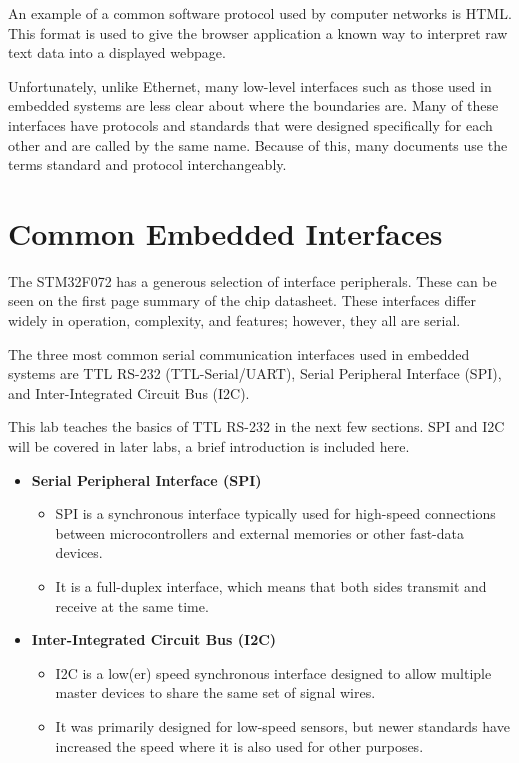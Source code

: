 \documentclass[11pt,fleqn]{book} %
\begin{document}
An example of a common software protocol used by computer networks is HTML. This format is used to give the browser application a known way to interpret raw text data into a displayed webpage. 

Unfortunately, unlike Ethernet, many low-level interfaces such as those used in embedded systems are less clear about where the boundaries are. Many of these interfaces have protocols and standards that were designed specifically for each other and are called by the same name. 
Because of this, many documents use the terms standard and protocol interchangeably. 

\section{Common Embedded Interfaces}
The STM32F072 has a generous selection of interface peripherals. These can be seen on the first page summary of the chip datasheet. These interfaces differ widely in operation, complexity, and features; however, they all are serial. 

The three most common serial communication interfaces used in embedded systems are TTL RS-232 (TTL-Serial/UART), Serial Peripheral Interface (SPI), and Inter-Integrated Circuit Bus (I2C). 

This lab teaches the basics of TTL RS-232 in the next few sections. SPI and I2C will be covered in later labs, a brief introduction is included here. 

\begin{itemize}
    \item \textbf{Serial Peripheral Interface (SPI)}
    \begin{itemize}
        \item SPI is a synchronous interface typically used for high-speed connections between microcontrollers and external memories or other fast-data devices.
        \item It is a full-duplex interface, which means that both sides transmit and receive at the same time.
    \end{itemize}
    \item \textbf{Inter-Integrated Circuit Bus (I2C)}
    \begin{itemize}
        \item I2C is a low(er) speed synchronous interface designed to allow multiple master devices to share the same set of signal wires. 
        \item It was primarily designed for low-speed sensors, but newer standards have increased the speed where it is also used for other purposes.
    \end{itemize}
\end{itemize}
\end{document}
